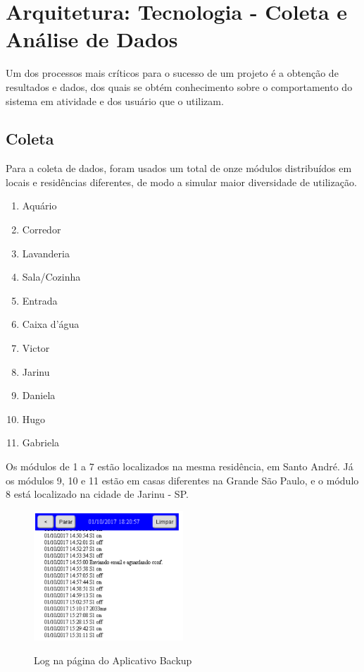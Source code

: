 \chapter{Arquitetura: Tecnologia - Coleta e Análise de Dados \label{coletaAnaliseDados}}

Um dos processos mais críticos para o sucesso de um projeto é a obtenção de resultados e dados, dos quais se obtém conhecimento sobre o comportamento do sistema em atividade e dos usuário que o utilizam.

\section{Coleta}

Para a coleta de dados, foram usados um total de onze módulos distribuídos em locais e residências diferentes, de modo a simular maior diversidade de utilização.

\begin{enumerate}
	\item Aquário
	\item Corredor
	\item Lavanderia
	\item Sala/Cozinha
	\item Entrada
	\item Caixa d’água
	\item Victor
	\item Jarinu
	\item Daniela
	\item Hugo
	\item Gabriela
\end{enumerate}

Os módulos de 1 a 7 estão localizados na mesma residência, em Santo André. Já os módulos 9, 10 e 11 estão em casas diferentes na Grande São Paulo, e o módulo 8 está localizado na cidade de Jarinu - SP.

\begin{figure}[H]
	\centering
	\caption{Log na página do Aplicativo Backup}
	\includegraphics[width=0.5\textwidth]{logAppBackup}
	\label{fig:logAppBackup}
\end{figure}

